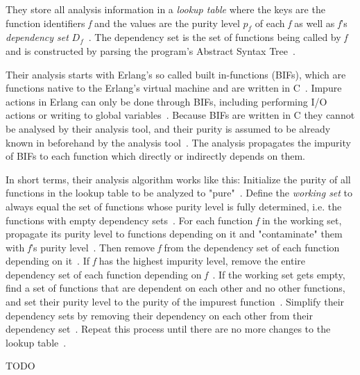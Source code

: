 \documentclass[a4paper,12pt]{article}
\begin{document}
They store all analysis information in a \textit{lookup table} where the keys are the function identifiers \textit{f} and the values are the purity level \textit{$p_f$} of each \textit{f} as well as \textit{f}'s \textit{dependency set} $D_f$~\cite{pitidis2010purity}. The dependency set is the set of functions being called by \textit{f} and is constructed by parsing the program's Abstract Syntax Tree~\cite{pitidis2010purity}.

Their analysis starts with Erlang's so called built in-functions (BIFs), which are functions native to the Erlang's virtual machine and are written in C~\cite{pitidis2010purity}. Impure actions in Erlang can only be done through BIFs, including performing I/O actions or writing to global variables~\cite{kostis-email}. Because BIFs are written in C they cannot be analysed by their analysis tool, and their purity is assumed to be already known in beforehand by the analysis tool~\cite{pitidis2010purity}. The analysis propagates the impurity of BIFs to each function which directly or indirectly depends on them.

In short terms, their analysis algorithm works like this: Initialize the purity of all functions in the lookup table to be analyzed to "pure"~\cite{pitidis2010purity}. Define the \textit{working set} to always equal the set of functions whose purity level is fully determined, i.e. the functions with empty dependency sets~\cite{pitidis2010purity}. For each function \textit{f} in the working set, propagate its purity level to functions depending on it and "contaminate" them with \textit{f}'s purity level~\cite{pitidis2010purity}. Then remove \textit{f} from the  dependency set of each function depending on it~\cite{pitidis2010purity}. If \textit{f} has the highest impurity level, remove the entire dependency set of each function depending on \textit{f}~\cite{pitidis2010purity}. If the working set gets empty, find a set of functions that are dependent on each other and no other functions, and set their purity level to the purity of the impurest function~\cite{pitidis2010purity}. Simplify their dependency sets by removing their dependency on each other from their dependency set~\cite{pitidis2010purity}. Repeat this process until there are no more changes to the lookup table~\cite{pitidis2010purity}.

TODO

\end{document}
